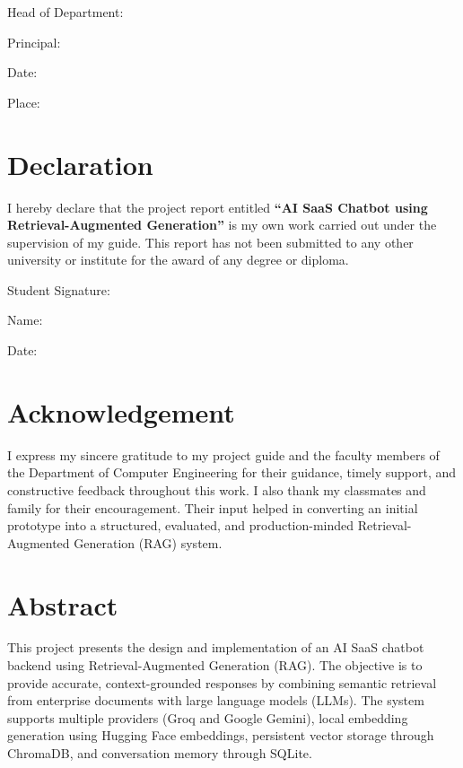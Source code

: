 \documentclass[12pt,letterpaper]{report}
\begin{document}
\vspace{1cm}
\noindent Head of Department: \hrulefill

\vspace{1cm}
\noindent Principal: \hrulefill

\vspace{1cm}
\noindent Date: \hrulefill

\vspace{1cm}
\noindent Place: \hrulefill

\chapter*{Declaration}
I hereby declare that the project report entitled \textbf{``AI SaaS Chatbot using Retrieval-Augmented Generation''} is my own work carried out under the supervision of my guide. This report has not been submitted to any other university or institute for the award of any degree or diploma.

\vspace{2cm}
\noindent Student Signature: \hrulefill

\vspace{1cm}
\noindent Name: \hrulefill

\vspace{1cm}
\noindent Date: \hrulefill

\chapter*{Acknowledgement}
I express my sincere gratitude to my project guide and the faculty members of the Department of Computer Engineering for their guidance, timely support, and constructive feedback throughout this work. I also thank my classmates and family for their encouragement. Their input helped in converting an initial prototype into a structured, evaluated, and production-minded Retrieval-Augmented Generation (RAG) system.

\chapter*{Abstract}
This project presents the design and implementation of an AI SaaS chatbot backend using Retrieval-Augmented Generation (RAG). The objective is to provide accurate, context-grounded responses by combining semantic retrieval from enterprise documents with large language models (LLMs). The system supports multiple providers (Groq and Google Gemini), local embedding generation using Hugging Face embeddings, persistent vector storage through ChromaDB, and conversation memory through SQLite.
\end{document}
